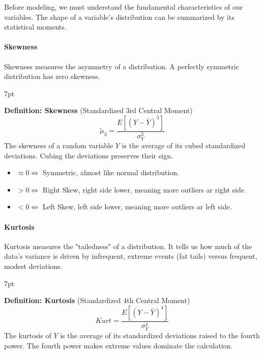 \documentclass{article}
\newenvironment{greenblock}{%
\def\FrameCommand{%
  \hspace{1pt}%
    {\color{Green}%
    \vrule width 2pt}%
    {\color{greenshade}%
    \vrule width 4pt}%
  \colorbox{greenshade}%
}%
\MakeFramed{%
  \advance%
  \hsize-%
  \width%
  \FrameRestore}%
\noindent\hspace{-4.55pt}%
\begin{adjustwidth}{}{7pt}%
\vspace{2pt}\vspace{2pt}%
}
{%
\vspace{2pt}\end{adjustwidth}\endMakeFramed%
}
\begin{document}



Before modeling, we must understand the fundamental characteristics of our variables. The shape of a variable's distribution can be summarized by its statistical moments.

\paragraph{Skewness}

Skewness measures the asymmetry of a distribution. A perfectly symmetric distribution has zero skewness.

\begin{greenblock}
\textbf{Definition: Skewness} (Standardized 3rd Central Moment)
\begin{equation}
\tilde \mu_3=\frac{E[(Y-\bar Y)^3]}{\sigma^3_Y}
\end{equation}
The skewness of a random variable $Y$ is the average of its cubed standardized deviations. Cubing the deviations preserves their sign.
\end{greenblock}


\begin{itemize}
  \item $\approx 0 \iff $ Symmetric, almost like normal distribution.

  \item $>0 \iff $ Right Skew, right side lower, meaning more outliers ar right side.
  
  \item $<0 \iff $ Left Skew, left side lower, meaning more outliers ar left side.
\end{itemize}
  

\paragraph{Kurtosis}  


Kurtosis measures the "tailedness" of a distribution. It tells us how much of the data's variance is driven by infrequent, extreme events (fat tails) versus frequent, modest deviations.
\begin{greenblock}
\textbf{Definition: Kurtosis} (Standardized 4th Central Moment)
\begin{equation}
Kurt=\frac{E[(Y-\bar Y)^4]}{\sigma^4_Y}
\end{equation}
The kurtosis of $Y$ is the average of its standardized deviations raised to the fourth power. The fourth power makes extreme values dominate the calculation.
\end{greenblock}
\end{document}
